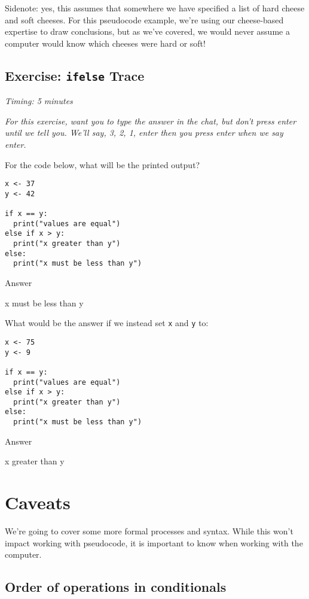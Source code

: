 \documentclass[
]{book}
\begin{document}
Sidenote: yes, this assumes that somewhere we have specified a list of hard cheese and soft cheeses. For this pseudocode example, we're using our cheese-based expertise to draw conclusions, but as we've covered, we would never assume a computer would know which cheeses were hard or soft!

\subsection{\texorpdfstring{Exercise: \texttt{ifelse} Trace}{Exercise: ifelse Trace}}\label{exercise-ifelse-trace}

\emph{Timing: 5 minutes}

\emph{For this exercise, want you to type the answer in the chat, but don't press enter until we tell you. We'll say, \emph{3, 2, 1, enter} then you press enter when we say \emph{enter}.}

For the code below, what will be the printed output?

\begin{verbatim}
x <- 37
y <- 42

if x == y:
  print("values are equal")
else if x > y:
  print("x greater than y")
else:
  print("x must be less than y")
\end{verbatim}

Answer

x must be less than y

\hfill\break

What would be the answer if we instead set \texttt{x} and \texttt{y} to:

\begin{verbatim}
x <- 75
y <- 9

if x == y:
  print("values are equal")
else if x > y:
  print("x greater than y")
else:
  print("x must be less than y")
\end{verbatim}

Answer

x greater than y

\hfill\break

\section{Caveats}\label{caveats-1}

We're going to cover some more formal processes and syntax. While this won't impact working with pseudocode, it is important to know when working with the computer.

\subsection{Order of operations in conditionals}\label{order-of-operations-in-conditionals}
\end{document}
